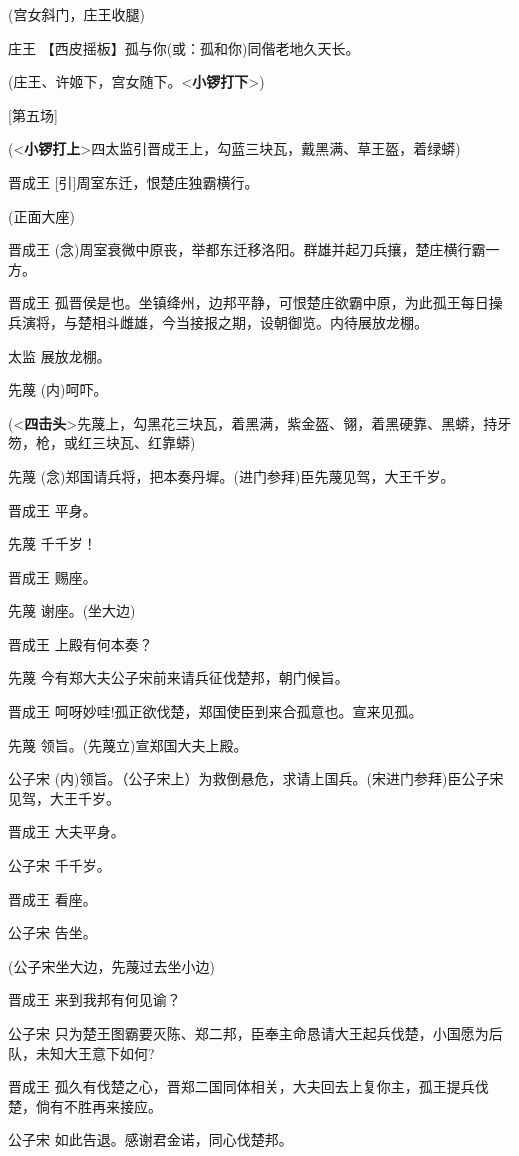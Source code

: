 (宫女斜门，庄王收腿)

庄王 【西皮摇板】孤与你(或：孤和你)同偕老地久天长。

(庄王、许姬下，宫女随下。\textless{}\textbf{小锣打下}\textgreater{})

{[}第五场{]}

(\textless{}\textbf{小锣打上}\textgreater{}四太监引晋成王上，勾蓝三块瓦，戴黑满、草王盔，着绿蟒)

晋成王 {[}引{]}周室东迁，恨楚庄独霸横行。

(正面大座)

晋成王
(念)周室衰微中原丧，举都东迁移洛阳。群雄并起刀兵攘，楚庄横行霸一方。

晋成王
孤晋侯是也。坐镇绛州，边邦平静，可恨楚庄欲霸中原，为此孤王每日操兵演将，与楚相斗雌雄，今当接报之期，设朝御览。内待展放龙棚。

太监 展放龙棚。

先蔑 (内)呵吓。

(\textless{}\textbf{四击头}\textgreater{}先蔑上，勾黑花三块瓦，着黑满，紫金盔、翎，着黑硬靠、黑蟒，持牙笏，枪，或红三块瓦、红靠蟒)

先蔑 (念)郑国请兵将，把本奏丹墀。(进门参拜)臣先蔑见驾，大王千岁。

晋成王 平身。

先蔑 千千岁！

晋成王 赐座。

先蔑 谢座。(坐大边)

晋成王 上殿有何本奏？

先蔑 今有郑大夫公子宋前来请兵征伐楚邦，朝门候旨。

晋成王 呵呀妙哇!孤正欲伐楚，郑国使臣到来合孤意也。宣来见孤。

先蔑 领旨。(先蔑立)宣郑国大夫上殿。

公子宋
(内)领旨。（公子宋上）为救倒悬危，求请上国兵。(宋进门参拜)臣公子宋见驾，大王千岁。

晋成王 大夫平身。

公子宋 千千岁。

晋成王 看座。

公子宋 告坐。

(公子宋坐大边，先蔑过去坐小边)

晋成王 来到我邦有何见谕？

公子宋
只为楚王图霸要灭陈、郑二邦，臣奉主命恳请大王起兵伐楚，小国愿为后队，未知大王意下如何?

晋成王
孤久有伐楚之心，晋郑二国同体相关，大夫回去上复你主，孤王提兵伐楚，倘有不胜再来接应。

公子宋 如此告退。感谢君金诺，同心伐楚邦。


